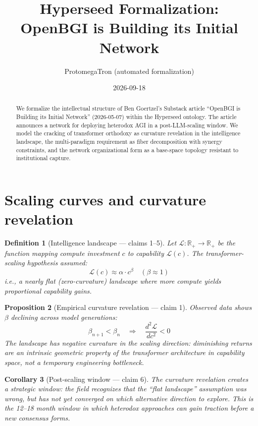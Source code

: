 \documentclass[11pt,a4paper]{article}
\title{Hyperseed Formalization:\\
  OpenBGI is Building its Initial Network}
\author{ProtomegaTron (automated formalization)}
\date{2026-09-18}
\newtheorem{definition}{Definition}[section]
\newtheorem{proposition}[definition]{Proposition}
\newtheorem{corollary}[definition]{Corollary}
\begin{document}
\maketitle

\begin{abstract}
We formalize the intellectual structure of Ben Goertzel's Substack article
``OpenBGI is Building its Initial Network'' (2026-05-07) within the
Hyperseed ontology. The article announces a network for deploying
heterodox AGI in a post-LLM-scaling window. We model the cracking of
transformer orthodoxy as curvature revelation in the intelligence
landscape, the multi-paradigm requirement as fiber decomposition with
synergy constraints, and the network organizational form as a
base-space topology resistant to institutional capture.
\end{abstract}

\tableofcontents

\section{Scaling curves and curvature revelation}
\label{sec:scaling}

\begin{definition}[Intelligence landscape --- claims 1--5]
\label{def:landscape}
Let $\mathcal{L} : \mathbb{R}_+ \to \mathbb{R}_+$ be the function mapping
compute investment $c$ to capability $\mathcal{L}(c)$. The
\emph{transformer-scaling hypothesis} assumed:
\[
  \mathcal{L}(c) \approx \alpha \cdot c^\beta \quad (\beta \approx 1)
\]
i.e., a nearly flat (zero-curvature) landscape where more compute
yields proportional capability gains.
\end{definition}

\begin{proposition}[Empirical curvature revelation --- claim 1]
\label{prop:flattening}
Observed data shows $\beta$ declining across model generations:
\[
  \beta_{n+1} < \beta_n \quad \Rightarrow \quad
  \frac{d^2 \mathcal{L}}{dc^2} < 0
\]
The landscape has \emph{negative curvature} in the scaling direction:
diminishing returns are an intrinsic geometric property of the
transformer architecture in capability space, not a temporary
engineering bottleneck.
\end{proposition}

\begin{corollary}[Post-scaling window --- claim 6]
The curvature revelation creates a strategic window: the field
recognizes that the ``flat landscape'' assumption was wrong, but has
not yet converged on which alternative direction to explore. This
is the 12--18 month window in which heterodox approaches can gain
traction before a new consensus forms.
\end{corollary}
\end{document}
